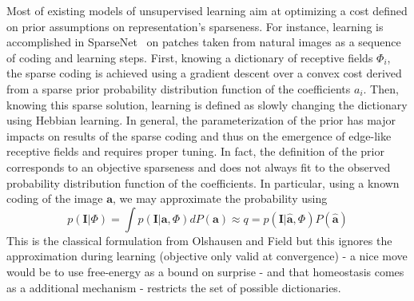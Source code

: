 \documentclass[a4paper, 11pt, draft]{article} %
\newcommand{\coef}{\mathbf{a}} %
\newcommand{\image}{\mathbf{I}} %
\newcommand{\dico}{\Phi} %
\begin{document}
Most of existing models of unsupervised learning aim at optimizing a cost defined on prior assumptions on representation's sparseness. For instance, learning is accomplished in {\sc SparseNet}~\citep{Olshausen97} on patches taken from natural images as a sequence of coding and learning steps. First, knowing a dictionary of receptive fields $\dico_i$, the sparse coding is achieved using a gradient descent over a convex cost derived from a sparse prior probability distribution function of the coefficients $a_i$. Then, knowing this sparse solution, learning is defined as slowly changing the dictionary using Hebbian learning. In general, the parameterization of the prior has major impacts on results of the sparse coding and thus on the emergence of edge-like receptive fields and requires proper tuning. In fact, the definition of the prior corresponds to an objective sparseness and does not always fit to the observed probability distribution function of the coefficients. 
In particular, using a known coding of the image $\coef$, we may approximate the probability using
\begin{equation} p(\image | \dico ) = \int  p(\image | \coef, \dico ) dP(\coef) \approx q = p(\image | \hat{\coef}, \dico ) P(\hat{\coef}) \end{equation}
This is the classical formulation from Olshausen and Field but this ignores the approximation during learning (objective only valid at convergence) - a nice move would be to use free-energy as a bound on surprise - and that homeostasis comes as a additional mechanism - restricts the set of possible dictionaries.


\end{document}
